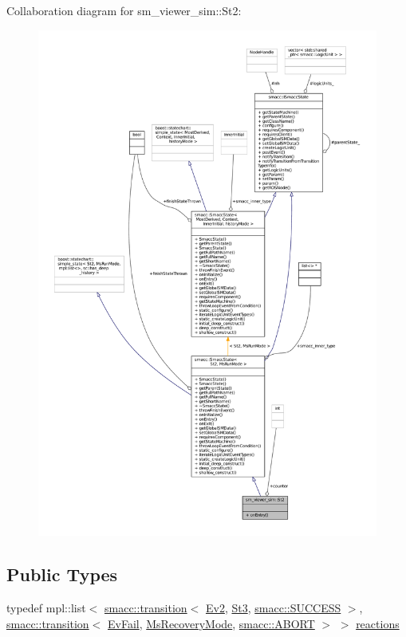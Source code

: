 Collaboration diagram for sm\+\_\+viewer\+\_\+sim\+:\+:St2\+:
\nopagebreak
\begin{figure}[H]
\begin{center}
\leavevmode
\includegraphics[width=350pt]{structsm__viewer__sim_1_1St2__coll__graph}
\end{center}
\end{figure}
\subsection*{Public Types}
\begin{DoxyCompactItemize}
\item 
typedef mpl\+::list$<$ \hyperlink{classsmacc_1_1transition}{smacc\+::transition}$<$ \hyperlink{structsm__viewer__sim_1_1Ev2}{Ev2}, \hyperlink{structsm__viewer__sim_1_1St3}{St3}, \hyperlink{structsmacc_1_1default__transition__tags_1_1SUCCESS}{smacc\+::\+S\+U\+C\+C\+E\+SS} $>$, \hyperlink{classsmacc_1_1transition}{smacc\+::transition}$<$ \hyperlink{structsm__viewer__sim_1_1EvFail}{Ev\+Fail}, \hyperlink{structsm__viewer__sim_1_1MsRecoveryMode}{Ms\+Recovery\+Mode}, \hyperlink{structsmacc_1_1default__transition__tags_1_1ABORT}{smacc\+::\+A\+B\+O\+RT} $>$ $>$ \hyperlink{structsm__viewer__sim_1_1St2_adef5108438c9d8891229f9d247bd5995}{reactions}
\end{DoxyCompactItemize}
